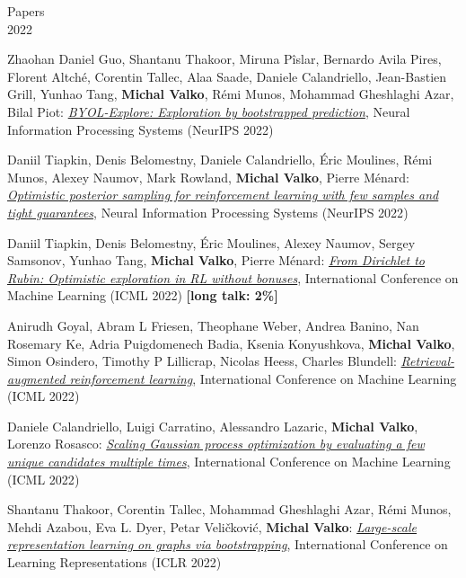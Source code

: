 \documentclass{resume}
\begin{document}
\begin{category}{Papers\\2022}


\citembullet
Zhaohan Daniel Guo, Shantanu Thakoor, Miruna P\^islar, Bernardo Avila Pires, Florent Altch\' e, Corentin Tallec, Alaa Saade, Daniele Calandriello, Jean-Bastien Grill, Yunhao Tang,  {\bf Michal Valko}, R\' emi Munos, Mohammad Gheshlaghi Azar, Bilal Piot:   
\href{https://arxiv.org/pdf/2206.08332.pdf}
{\emph{BYOL-Explore: Exploration by bootstrapped prediction}},
Neural Information Processing Systems
({\sf NeurIPS 2022}) 

\citembullet
Daniil Tiapkin, Denis Belomestny, Daniele Calandriello, \' Eric Moulines, R\' emi Munos, Alexey Naumov, Mark Rowland, {\bf Michal Valko}, Pierre M\' enard: 
\href{https://arxiv.org/pdf/2209.14414.pdf} 
{\emph{Optimistic posterior sampling for reinforcement learning with few samples and tight guarantees}},
Neural Information Processing Systems
({\sf NeurIPS 2022}) 



\citembullet
Daniil Tiapkin, Denis Belomestny, \' Eric Moulines, Alexey Naumov, Sergey Samsonov, Yunhao Tang, {\bf Michal Valko}, Pierre M\' enard:   
\href{https://arxiv.org/pdf/2205.07704.pdf}
{\emph{From Dirichlet to Rubin: Optimistic exploration in RL without bonuses}},
International Conference on Machine Learning
({\sf ICML 2022})  {\bf [long talk: 2\%]}


\citembullet
Anirudh Goyal, Abram L Friesen, Theophane Weber, Andrea Banino, Nan Rosemary Ke, Adria Puigdomenech Badia, Ksenia Konyushkova,  {\bf Michal Valko}, Simon Osindero, Timothy P Lillicrap, Nicolas Heess, Charles Blundell:
\href{https://arxiv.org/pdf/2202.08417.pdf}
{\emph{Retrieval-augmented reinforcement learning}},
International Conference on Machine Learning
({\sf ICML 2022}) 


\citembullet
Daniele Calandriello, Luigi Carratino, Alessandro Lazaric,  {\bf Michal Valko}, Lorenzo Rosasco:
\href{https://arxiv.org/pdf/2201.12909.pdf}
{\emph{Scaling Gaussian process optimization by evaluating a few unique candidates multiple times}},
International Conference on Machine Learning
({\sf ICML 2022}) 



\citembullet
Shantanu Thakoor, Corentin Tallec, Mohammad Gheshlaghi Azar, R\' emi Munos,  Mehdi Azabou, Eva L. Dyer, Petar Veličković, {\bf Michal Valko}:
\href{https://arxiv.org/pdf/2102.06514.pdf}{\emph{Large-scale representation learning on graphs via bootstrapping}},
International Conference on Learning Representations
({\sf ICLR 2022}) 



\end{category}
\end{document}
